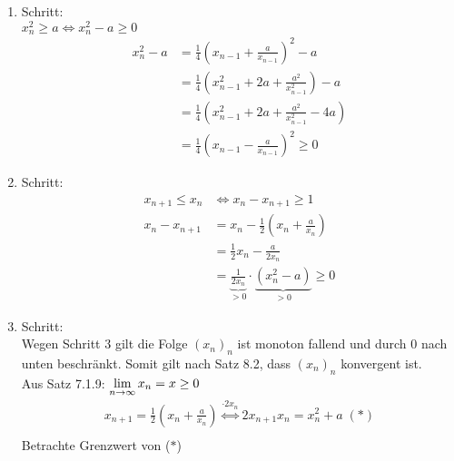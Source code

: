 \documentclass[../ana1u.tex]{subfiles}
\begin{document}
\begin{bsp}
\begin{bew}
\begin{enumerate}
                (IS): \(n \rightarrow n+1\): für beliebiges, aber festes n sei gezeigt, dass \(x_n > 0\)\\
                Dann gilt \(x_{n+1} = \frac{1}{2}(\underbrace{x_n}_{>0} + \underbrace{\frac{a}{x_n}}_{>0}) > 0\) wohldefiniert, weil \(x_n > 0\)\\
                Somit gilt nach dem Induktionsprinzip \(x_n > 0 \; \forall \, n \in \N\)
            \item Schritt:\\
                \(x_n^2 \geq a \Leftrightarrow x_n^2 - a \geq 0 \)
                \begin{align*}
                    x_n^2 - a &= \frac{1}{4}\left(x_{n-1} + \frac{a}{x_{n-1}}\right)^2 - a\\
                    &= \frac{1}{4}\left(x_{n-1}^2 + 2a + \frac{a^2}{x_{n-1}^2}\right) - a\\
                    &= \frac{1}{4}\left(x_{n-1}^2 + 2a + \frac{a^2}{x_{n-1}^2} - 4a\right)\\
                    &= \frac{1}{4}\left(x_{n-1} - \frac{a}{x_{n-1}}\right)^2 \geq 0
                \end{align*}
            \item Schritt:
                \begin{align*}
                    x_{n+1} \leq x_n &\Leftrightarrow x_n - x_{n+1} \geq 1\\
                    x_n - x_{n+1} &= x_n - \frac{1}{2}(x_n + \frac{a}{x_n})\\
                    &=\frac{1}{2}x_n - \frac{a}{2x_n}\\
                    &= \underbrace{\frac{1}{2x_n}}_{>0} \cdot \underbrace{(x_n^2 - a)}_{>0} \geq 0
                \end{align*}
            \item Schritt:\\
                Wegen Schritt 3 gilt die Folge \((x_n)_n\) ist monoton fallend und durch 0 nach unten beschränkt. Somit gilt nach Satz 8.2, dass \((x_n)_n\) konvergent ist.\\
                Aus Satz 7.1.9:
                \(\lim\limits_{n\rightarrow\infty} x_n = x \geq 0\)
                \begin{align*}
                    x_{n+1} = \frac{1}{2}(x_n + \frac{a}{x_n}) \overset{\cdot 2x_n} {\Leftrightarrow} 2x_{n+1}x_n = x_n^2 + a \;(\ast)\\						
                \end{align*}
                Betrachte Grenzwert von (\(\ast\))

\end{enumerate}
\end{bew}
\end{bsp}
\end{document}

